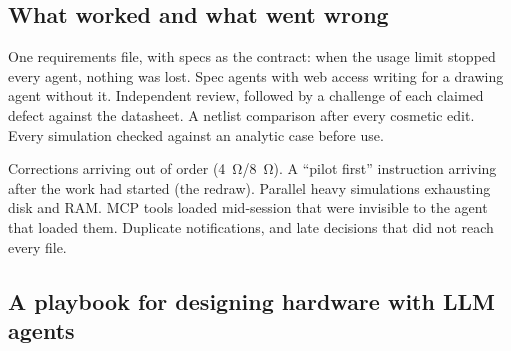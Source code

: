 \subsection{What worked and what went wrong}

\begin{description}[style=nextline,leftmargin=1.2em,itemsep=3pt]
  \item[Worked] One requirements file, with specs as the contract: when the usage limit stopped every agent, nothing was lost. Spec agents with web access writing for a drawing agent without it. Independent review, followed by a challenge of each claimed defect against the datasheet. A netlist comparison after every cosmetic edit. Every simulation checked against an analytic case before use.
  \item[Went wrong] Corrections arriving out of order (\qty{4}{\ohm}/\qty{8}{\ohm}). A ``pilot first'' instruction arriving after the work had started (the redraw). Parallel heavy simulations exhausting disk and RAM. MCP tools loaded mid-session that were invisible to the agent that loaded them. Duplicate notifications, and late decisions that did not reach every file.
\end{description}

\subsection{A playbook for designing hardware with LLM agents}\label{sec:playbook}

